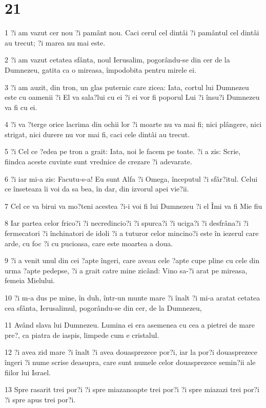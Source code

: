\chapter{21}

\par 1 ?i am vazut cer nou ?i pamânt nou. Caci cerul cel dintâi ?i pamântul cel dintâi au trecut; ?i marea nu mai este.
\par 2 ?i am vazut cetatea sfânta, noul Ierusalim, pogorându-se din cer de la Dumnezeu, gatita ca o mireasa, împodobita pentru mirele ei.
\par 3 ?i am auzit, din tron, un glas puternic care zicea: Iata, cortul lui Dumnezeu este cu oamenii ?i El va sala?lui cu ei ?i ei vor fi poporul Lui ?i însu?i Dumnezeu va fi cu ei.
\par 4 ?i va ?terge orice lacrima din ochii lor ?i moarte nu va mai fi; nici plângere, nici strigat, nici durere nu vor mai fi, caci cele dintâi au trecut.
\par 5 ?i Cel ce ?edea pe tron a grait: Iata, noi le facem pe toate. ?i a zis: Scrie, fiindca aceste cuvinte sunt vrednice de crezare ?i adevarate.
\par 6 ?i iar mi-a zis: Facutu-s-a! Eu sunt Alfa ?i Omega, începutul ?i sfâr?itul. Celui ce înseteaza îi voi da sa bea, în dar, din izvorul apei vie?ii.
\par 7 Cel ce va birui va mo?teni acestea ?i-i voi fi lui Dumnezeu ?i el Îmi va fi Mie fiu
\par 8 Iar partea celor frico?i ?i necredincio?i ?i spurca?i ?i uciga?i ?i desfrâna?i ?i fermecatori ?i închinatori de idoli ?i a tuturor celor mincino?i este în iezerul care arde, cu foc ?i cu pucioasa, care este moartea a doua.
\par 9 ?i a venit unul din cei ?apte îngeri, care aveau cele ?apte cupe pline cu cele din urma ?apte pedepse, ?i a grait catre mine zicând: Vino sa-?i arat pe mireasa, femeia Mielului.
\par 10 ?i m-a dus pe mine, în duh, într-un munte mare ?i înalt ?i mi-a aratat cetatea cea sfânta, Ierusalimul, pogorându-se din cer, de la Dumnezeu,
\par 11 Având slava lui Dumnezeu. Lumina ei era asemenea cu cea a pietrei de mare pre?, ca piatra de iaspis, limpede cum e cristalul.
\par 12 ?i avea zid mare ?i înalt ?i avea douasprezece por?i, iar la por?i douasprezece îngeri ?i nume scrise deasupra, care sunt numele celor douasprezece semin?ii ale fiilor lui Israel.
\par 13 Spre rasarit trei por?i ?i spre miazanoapte trei por?i ?i spre miazazi trei por?i ?i spre apus trei por?i.
